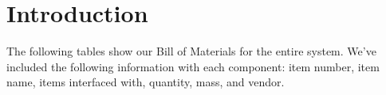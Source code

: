 \documentclass[]{auvsi_doc}
\begin{document}
	\begin{AUVSITitlePage}
		\begin{artifacttable}
		\end{artifacttable}
	\end{AUVSITitlePage}

	\section{Introduction}
	The following tables show our Bill of Materials for the entire system. We've included the following information with each component: item number, item name, items interfaced with, quantity, mass, and vendor.

\end{document}
